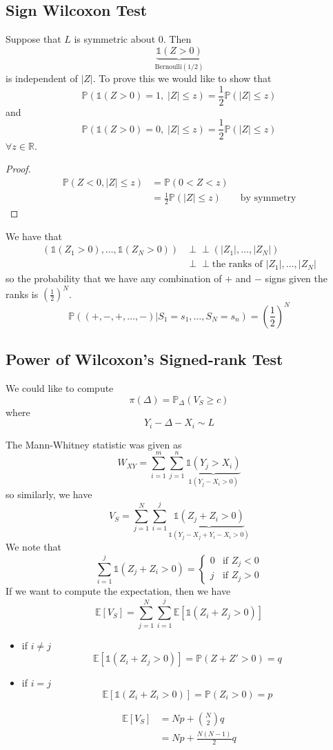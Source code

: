 \documentclass[a4paper,12pt]{amsart}
\newcommand{\sumim}{\sum_{i=1}^m}
\newcommand{\sumjn}{\sum_{j=1}^n}
\newcommand{\E}[1]{\mathbb{E}\left[#1\right]}
\newcommand{\p}[1]{\mathbb{P}\left(#1\right)}
\newcommand{\indep}{\perp \!\!\! \perp}
\newcommand{\sP}{\mathbb{P}}
\begin{document}
\subsection{Sign Wilcoxon Test}
Suppose that $L$ is symmetric about $0$. Then
\[
\underbrace{\mathds{1}(Z>0)}_{\text{Bernoulli}(1/2)}
\]
is independent of $|Z|$. To prove this we would like to show that 
\[\p{\mathds{1}(Z>0)=1, \; |Z| \leq z} = \frac{1}{2}\p{|Z| \leq z}\]
and
\[\p{\mathds{1}(Z>0)=0, \; |Z| \leq z} = \frac{1}{2}\p{|Z| \leq z}\] $\forall z \in \mathbb{R}$.
\begin{proof}
\begin{align*}
\p{Z<0,|Z|\leq z} &= \p{0 < Z < z}\\
&=\frac{1}{2}\p{|Z| \leq z} \qquad \text{by symmetry} 
\end{align*}
\end{proof}
We have that
\begin{align*}
(\mathds{1}(Z_1>0), \ldots, \mathds{1}(Z_N>0)) &\indep (|Z_1|,\ldots,|Z_N|)\\
&\indep \text{the ranks of }|Z_1|, \ldots, |Z_N|
\end{align*}
so the probability that we have any combination of $+$ and $-$ signs given the ranks is $\left(\frac{1}{2}\right)^N$.
\[\p{(+,-,+,\ldots,-) | S_1 = s_1, \ldots, S_N = s_n} = \left(\frac{1}{2}\right)^N\]

\subsection{Power of Wilcoxon's Signed-rank Test}
We could like to compute
\[\pi(\Delta) = \sP_\Delta(V_S \geq c)\]
where
\[Y_i - \Delta - X_i \sim L\]

The Mann-Whitney statistic was given as 
\[W_{XY} = \sumim \sumjn \underbrace{\mathds{1}(Y_j>X_i)}_{\mathds{1}(Y_j-X_i>0)}\]
so similarly, we have
\[V_S = \sum_{j=1}^N \sum_{i=1}^j \underbrace{\mathds{1}(Z_j + Z_i >0)}_{\mathds{1}(Y_j - X_j + Y_i - X_i > 0)}\]
We note that
\[\sum_{i=1}^j \mathds{1}(Z_j + Z_i>0) =\begin{cases}
0 & \text{if } Z_j < 0\\
j & \text{if } Z_j > 0 
\end{cases} \]
If we want to compute the expectation, then we have
\[
\E{V_S} = \sum_{j=1}^N \sum_{i=1}^j \E{\mathds{1}(Z_i + Z_j > 0)}\]
\begin{itemize}
\item if $i \neq j$
\[\E{\mathds{1}(Z_i + Z_j > 0 )} = \p{Z + Z' >0} =q\]
\item if $i=j$
\[\E{\mathds{1}(Z_i + Z_i> 0 )} = \p{Z_i > 0 } = p\]
\end{itemize}
\begin{align*}
\E{V_S} &= N p + { N \choose 2} q\\
&= Np + \frac{N(N-1)}{2}q
\end{align*}
\end{document}
